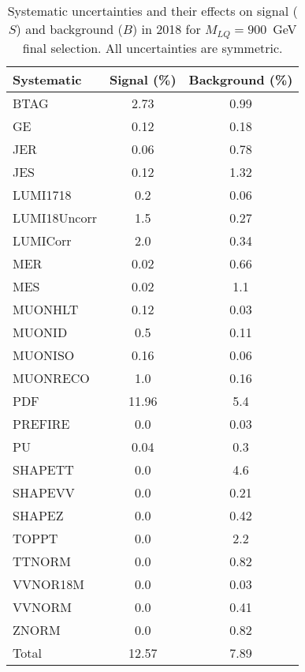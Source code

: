 \begin{table}[htbp]
\begin{center}
\caption{Systematic uncertainties and their effects on signal ($S$) and background ($B$) in 2018 for $M_{LQ}=900$~GeV final selection. All uncertainties are symmetric.}
\begin{tabular}{lcc}
\hline\hline
Systematic & Signal (\%) & Background (\%) \\ \hline 
BTAG & 2.73 & 0.99\\ 
GE & 0.12 & 0.18\\ 
JER & 0.06 & 0.78\\ 
JES & 0.12 & 1.32\\ 
LUMI1718 & 0.2 & 0.06\\ 
LUMI18Uncorr & 1.5 & 0.27\\ 
LUMICorr & 2.0 & 0.34\\ 
MER & 0.02 & 0.66\\ 
MES & 0.02 & 1.1\\ 
MUONHLT & 0.12 & 0.03\\ 
MUONID & 0.5 & 0.11\\ 
MUONISO & 0.16 & 0.06\\ 
MUONRECO & 1.0 & 0.16\\ 
PDF & 11.96 & 5.4\\ 
PREFIRE & 0.0 & 0.03\\ 
PU & 0.04 & 0.3\\ 
SHAPETT & 0.0 & 4.6\\ 
SHAPEVV & 0.0 & 0.21\\ 
SHAPEZ & 0.0 & 0.42\\ 
TOPPT & 0.0 & 2.2\\ 
TTNORM & 0.0 & 0.82\\ 
VVNOR18M & 0.0 & 0.03\\ 
VVNORM & 0.0 & 0.41\\ 
ZNORM & 0.0 & 0.82\\ 
Total & 12.57 & 7.89\\ \hline \hline
\end{tabular}
\label{tab:SysUncertainties_uujj_900}
\end{center}
\end{table}

